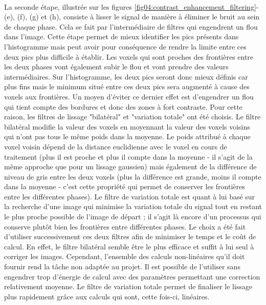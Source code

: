 			\paragraph{}La seconde étape, illustrée sur les figures \ref{fig04:contrast_enhancement_filtering}-(e), (f), (g) et (h), consiste à lisser le signal de manière à éliminer le bruit au sein de chaque phase. Cela se fait par l'intermédiaire de filtres qui engendrent un flou dans l'image. Cette étape permet de mieux identifier les pics présents dans l'histogramme mais peut avoir pour conséquence de rendre la limite entre ces deux pics plus difficile à établir. Les voxels qui sont proches des frontières entre les deux phases vont également subir le flou et vont prendre des valeurs intermédiaires. Sur l'histogramme, les deux pics seront donc mieux définis car plus fins mais le minimum situé entre ces deux pics sera augmenté à cause des voxels aux frontières. Un moyen d'éviter ce dernier effet est d'engendrer un flou qui tient compte des bordures et donc des zones à fort contraste. Pour cette raison, les filtres de lissage "bilatéral" \citep{tomasi_bilateral_1998} et "variation totale" \citep{chambolle_algorithm_2004} ont été choisis. Le filtre bilatéral modifie la valeur des voxels en moyennant la valeur des voxels voisins qui n'ont pas tous le même poids dans la moyenne. Le poids attribué à chaque voxel voisin dépend de la distance euclidienne avec le voxel en cours de traitement (plus il est proche et plus il compte dans la moyenne - il s'agit de la même approche que pour un lissage gaussien) mais également de la différence de niveau de gris entre les deux voxels (plus la différence est grande, moins il compte dans la moyenne - c'est cette propriété qui permet de conserver les frontières entre les différentes phases). Le filtre de variation totale est quant à lui basé sur la recherche d'une image qui minimise la variation totale du signal tout en restant le plus proche possible de l'image de départ ; il s'agit là encore d'un processus qui conserve plutôt bien les frontières entre différentes phases. Le choix a été fait d'utiliser successivement ces deux filtres afin de minimiser le temps et le coût de calcul. En effet, le filtre bilatéral semble être le plus efficace et suffit à lui seul à corriger les images. Cependant, l'ensemble des calculs non-linéaires qu'il doit fournir rend la tâche non adaptée au projet. Il est possible de l'utiliser sans engendrer trop d'énergie de calcul avec des paramètres permettant une correction relativement moyenne. Le filtre de variation totale permet de finaliser le lissage plus rapidement grâce aux calculs qui sont, cette fois-ci, linéaires.
